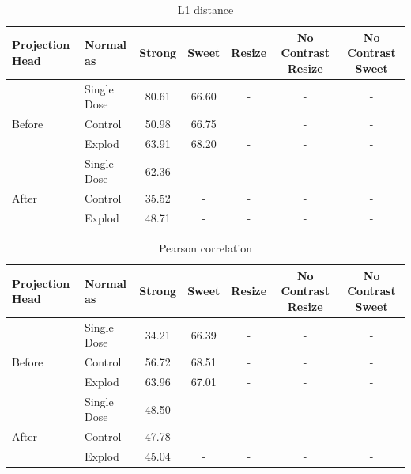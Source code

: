 \begin{table}[H]
  \centering
  \begin{tabular}{@{}llccccc@{}}
  \toprule
  Projection Head & Normal as       & Strong & Sweet & Resize & No Contrast Resize & No Contrast Sweet \\ \midrule
                  & Single Dose    & 80.61      & 66.60     & -      & -                  & -                 \\
  Before          & Control        & 50.98      & 66.75     &       & -                  & -                 \\
                  & Explod         & 63.91      & 68.20     & -      & -                  & -                 \\ \midrule
                  & Single Dose    & 62.36      & -     & -      & -                  & -                 \\
  After           & Control        & 35.52      & -     & -      & -                  & -                 \\
                  & Explod         & 48.71      & -     & -      & -                  & -                 \\ \bottomrule
  \end{tabular}
  \caption{L1 distance}
  \label{tab:table_label}
\end{table}

\begin{table}[H]
  \centering
  \begin{tabular}{@{}llccccc@{}}
  \toprule
  Projection Head & Normal as       & Strong & Sweet & Resize & No Contrast Resize & No Contrast Sweet \\ \midrule
                  & Single Dose    & 34.21      & 66.39     & -      & -                  & -                 \\
  Before          & Control        & 56.72      & 68.51     & -      & -                  & -                 \\
                  & Explod         & 63.96      & 67.01     & -      & -                  & -                 \\ \midrule
                  & Single Dose    & 48.50      & -     & -      & -                  & -                 \\
  After           & Control        & 47.78      & -     & -      & -                  & -                 \\
                  & Explod         & 45.04      & -     & -      & -                  & -                 \\ \bottomrule
  \end{tabular}
  \caption{Pearson correlation}
  \label{tab:table_label}
\end{table}


